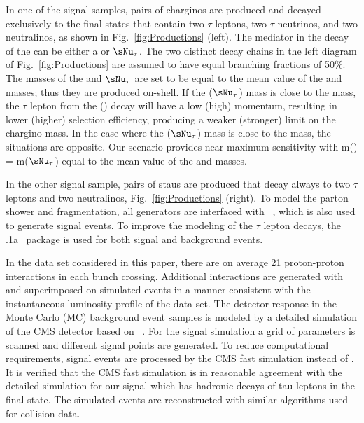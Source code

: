 In one of the signal samples, pairs of charginos are produced and decayed exclusively to the final states that contain 
two $\tau$ leptons, two $\tau$ neutrinos, and two neutralinos, as shown in Fig.~\ref{fig:Productions} (left). 
The mediator in the decay of the \chione can be either a \sTau or $\sNu_{\tau}$. 
The two distinct decay chains in the left diagram of Fig.~\ref{fig:Productions} 
are assumed to have equal branching fractions of 50\%. 
The masses of the \sTau and $\sNu_{\tau}$ are set to be equal to the mean value of the \chione and \PSGczDo masses; thus they are produced on-shell. 
If the \sTau ($\sNu_{\tau}$) mass is close to the \PSGczDo mass, the $\tau$ lepton from the \sTau (\chione) decay will 
have a low (high) momentum, resulting in lower (higher) selection efficiency, producing a weaker (stronger) limit on the chargino mass.
In the case where the \sTau ($\sNu_{\tau}$) mass is close to the \chione mass, the situations are opposite.
Our scenario provides near-maximum sensitivity with m(\sTau) = m($\sNu_{\tau}$) equal to the mean value of the \chione and \PSGczDo masses. 


In the other signal sample, pairs of staus are produced that decay always to two $\tau$ leptons and two neutralinos, Fig.~\ref{fig:Productions} (right). 
To model  the parton shower and fragmentation, all generators are interfaced with ~\cite{Sjostrand:2006za}, 
which is also used to generate signal events. To improve the modeling of the $\tau$ lepton decays, 
 the .1a~\cite{Davidson:2010rw} package is used for both signal and background events. 

In the data set considered in this paper,
there are on average 21 proton-proton interactions in each bunch crossing.
Additional interactions are generated with \PYTHIA and superimposed on simulated events in a manner consistent with 
the instantaneous luminosity profile of the data set.
The detector response in the  Monte Carlo (MC) background event samples is modeled by a
detailed simulation
of the CMS detector based on {\GEANTfour}~\cite{Agostinelli:2002hh}.  
For the signal simulation a grid of parameters is scanned and different signal points are generated. To reduce  computational requirements, signal events 
are processed by the CMS fast simulation \cite{Abdullin:2011zz} instead of {\GEANTfour}. 
It is verified that the CMS fast simulation is in reasonable agreement with the detailed simulation for our signal which has hadronic decays of 
tau leptons in the final state.
The simulated events are reconstructed with similar algorithms used for collision data.

